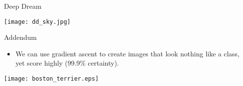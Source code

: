 \begin{frame}{Deep Dream}
	\begin{center}
		\texttt{[image: dd\_sky.jpg]}
	\end{center}
\end{frame}

\begin{frame}{Addendum}
	\begin{itemize}
		\item We can use gradient ascent to create images that look nothing like a class, yet score highly (99.9\% certainty).
	\end{itemize}
	\begin{center}
		\texttt{[image: boston\_terrier.eps]}
	\end{center}
\end{frame}


